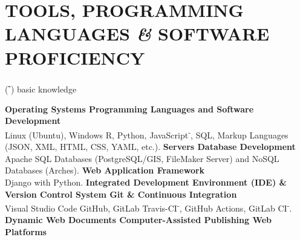 \documentclass{article}
\newcommand{\fr}[1]{}       %
\newcommand{\en}[1]{#1}     %
\begin{document}
\section*{\fr{OUTILS, LANGAGES DE PROGRAMMATION \textit{\&} LOGICIELS MAÎTRISÉS}\en{TOOLS, PROGRAMMING LANGUAGES \textit{\&} SOFTWARE PROFICIENCY}}
\begin{center}(\textbf{\textsuperscript{-}}) \fr{notions}\en{basic knowledge}\end{center}
\smallbreak
\textbf{\fr{Systèmes d'exploitation {\textbar} Langages de programmation et développement de logiciels}\en{Operating Systems {\textbar} Programming Languages and Software Development}} \\
\fr{Linux (Ubuntu), Windows \textbf{{\textbar}} \textsf{R}, \textsf{Python}, \textsf{JavaScript\textsuperscript{-}}, SQL, langages de balisage (JSON, XML, HTML, CSS, YAML, etc.).}
\en{Linux (Ubuntu), Windows \textbf{{\textbar}} \textsf{R}, \textsf{Python}, \textsf{JavaScript\textsuperscript{-}}, SQL, Markup Languages (JSON, XML, HTML, CSS, YAML, etc.).}
\smallbreak
\textbf{\fr{Serveurs {\textbar} Développement de bases de données}\en{Servers {\textbar} Database Development}} \\
\fr{Apache \textbf{{\textbar}} Bases de données SQL (PostgreSQL/GIS, FileMaker Server) et bases de données NoSQL (Arches).}
\en{Apache \textbf{{\textbar}} SQL Databases (PostgreSQL/GIS, FileMaker Server) and NoSQL Databases (Arches).}
\smallbreak
\textbf{\fr{Framework d'application web}\en{Web Application Framework}} \\
\fr{\textsf{Django} avec \textsf{Python}.}
\en{\textsf{Django} with \textsf{Python}.}
\smallbreak
\textbf{\fr{Environnement de développement intégré (IDE) \& Système de contrôle de version Git \& Intégration continue}\en{Integrated Development Environment (IDE) \& Version Control System Git \& Continuous Integration}} \\
\fr{Visual Studio Code \textbf{{\textbar}} GitHub, GitLab \textbf{{\textbar}} Travis-CI\textsuperscript{-}, GitHub Actions, GitLab CI\textsuperscript{-}.}
\en{Visual Studio Code \textbf{{\textbar}} GitHub, GitLab \textbf{{\textbar}} Travis-CI\textsuperscript{-}, GitHub Actions, GitLab CI\textsuperscript{-}.}
\smallbreak
\textbf{\fr{Documents web dynamiques {\textbar} Publication assistée par ordinateur {\textbar} Plateformes web}\en{Dynamic Web Documents {\textbar} Computer-Assisted Publishing {\textbar} Web Platforms}} \\
\fr{\textsf{Quarto}, \textsf{Rmarkdown}, \textsf{RShiny}, \textsf{Plotly}, \textsf{Jupyter Notebook} \textbf{{\textbar}} \LaTeX, \textsf{Markdown}, Microsoft Office \textbf{{\textbar}} RPubs, HAL, Zenodo.}
\end{document}
